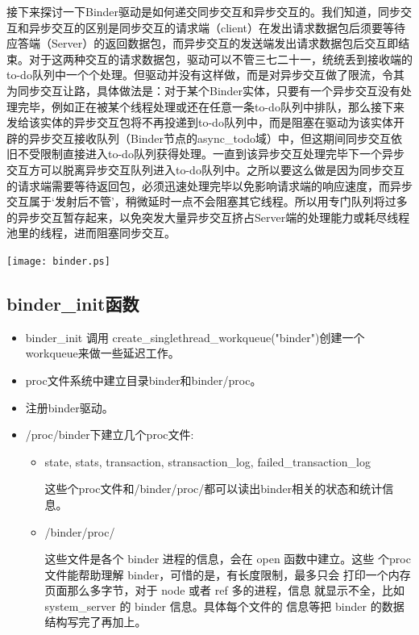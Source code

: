 \documentclass[a4paper,11pt]{article}
\begin{document}
接下来探讨一下Binder驱动是如何递交同步交互和异步交互的。我们知道，同步交互和异步交互的区别是同步交互的请求端（client）在发出请求数据包后须要等待应答端（Server）的返回数据包，而异步交互的发送端发出请求数据包后交互即结束。对于这两种交互的请求数据包，驱动可以不管三七二十一，统统丢到接收端的to-do队列中一个个处理。但驱动并没有这样做，而是对异步交互做了限流，令其为同步交互让路，具体做法是：对于某个Binder实体，只要有一个异步交互没有处理完毕，例如正在被某个线程处理或还在任意一条to-do队列中排队，那么接下来发给该实体的异步交互包将不再投递到to-do队列中，而是阻塞在驱动为该实体开辟的异步交互接收队列（Binder节点的async_todo域）中，但这期间同步交互依旧不受限制直接进入to-do队列获得处理。一直到该异步交互处理完毕下一个异步交互方可以脱离异步交互队列进入to-do队列中。之所以要这么做是因为同步交互的请求端需要等待返回包，必须迅速处理完毕以免影响请求端的响应速度，而异步交互属于‘发射后不管’，稍微延时一点不会阻塞其它线程。所以用专门队列将过多的异步交互暂存起来，以免突发大量异步交互挤占Server端的处理能力或耗尽线程池里的线程，进而阻塞同步交互。



\texttt{[image: binder.ps]}

\subsection{binder_init函数} 
\begin{itemize}
    \item binder_init 调用 create_singlethread_workqueue("binder")创建一个workqueue来做一些延迟工作。
    \item proc文件系统中建立目录binder和binder/proc。
    \item 注册binder驱动。
    \item /proc/binder下建立几个proc文件:
        \begin{itemize}
            \item state, stats, transaction, stransaction_log, failed_transaction_log

                这些个proc文件和/binder/proc/都可以读出binder相关的状态和统计信息。
            \item /binder/proc/

                 这些文件是各个 binder 进程的信息，会在 open 函数中建立。这些
                 个proc 文件能帮助理解 binder，可惜的是，有长度限制，最多只会
                 打印一个内存页面那么多字节，对于 node 或者 ref 多的进程，信息
                 就显示不全，比如 system_server 的 binder 信息。具体每个文件的
                 信息等把 binder 的数据结构写完了再加上。
        \end{itemize}

\end{itemize}
\end{document}

